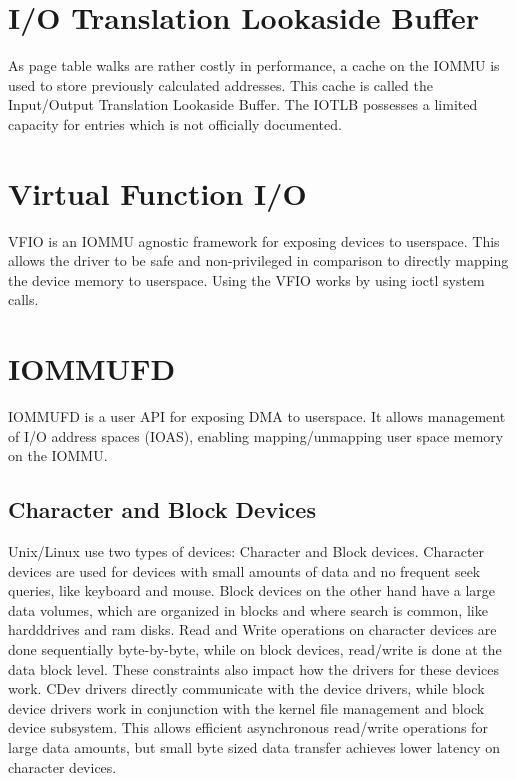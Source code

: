 \section{I/O Translation Lookaside Buffer}
As page table walks are rather costly in performance, a cache on the IOMMU is used to store previously calculated addresses. This cache is called the Input/Output Translation Lookaside Buffer. The IOTLB possesses a limited capacity for entries which is not officially documented.

\section{Virtual Function I/O}
VFIO is an IOMMU agnostic framework for exposing devices to userspace.
This allows the driver to be safe and non-privileged in comparison to directly mapping the device memory to userspace.
Using the VFIO works by using ioctl system calls.

\section{IOMMUFD}
IOMMUFD is a user API for exposing DMA to userspace.
It allows management of I/O address spaces (IOAS), enabling mapping/unmapping user space memory on the IOMMU.

\subsection{Character and Block Devices}
Unix/Linux use two types of devices: Character and Block devices. Character devices are used for devices with small amounts of data and no frequent seek queries, like keyboard and mouse. Block devices on the other hand have a large data volumes, which are organized in blocks and where search is common, like hardddrives and ram disks.
Read and Write operations on character devices are done sequentially byte-by-byte, while on block devices, read/write is done at the data block level.
These constraints also impact how the drivers for these devices work. CDev drivers directly communicate with the device drivers, while block device drivers work in conjunction with the kernel file management and block device subsystem. This allows efficient asynchronous read/write operations for large data amounts, but small byte sized data transfer achieves lower latency on character devices.